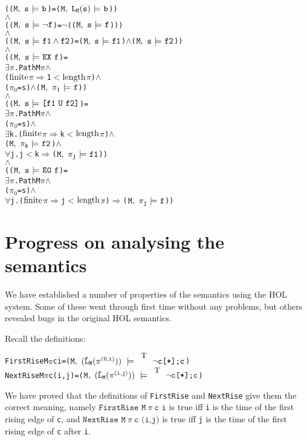 \documentclass{llncs}
\newcommand{\And}{\(\wedge\)}
\newcommand{\Imp}{\(\Rightarrow\)}
\newcommand{\Not}{\(\neg\)}
\newcommand{\Forall}{\(\forall\)}
\newcommand{\Exists}{\(\exists\)}
\newcommand{\IsFinitePath}{\({\rm{finite}}\)}
\newcommand{\PathLength}{\({\rm{length}}\)}
\newcommand{\Le}{\(<\)}
\newcommand{\T}{\texttt{\small\rm{T}}}
\newcommand{\bTrue}{\T}
\renewcommand{\Pi}{\(\pi\)}
\newcommand{\BSem}[3]{(\(\tt#1,~#2~{\models}~#3\))}
\newcommand{\SSem}[4]{(\(\tt{#1,~#2~\models^{\hspace*{-2.3mm}\raisebox{1mm}{\tt#3}}~#4}\))}
\newcommand{\OSem}[3]{(\(\tt{#1,~#2~{\models}~#3}\))}
\newcommand{\bNot}[1]{\neg#1}
\newcommand{\pathEl}[2]{#1_{#2}}
\newcommand{\PathEl}[2]{\(#1_{#2}\)}
\newcommand{\pathSeg}[2]{#1^{#2}}
\newcommand{\lHat}[1]{\hat{\texttt{L}}_{#1}}
\newcommand{\lNoHat}[1]{{\texttt{L}}_{#1}}
\newcommand{\sBool}[1]{#1}
\newcommand{\oBool}[1]{#1}
\newcommand{\oNot}[1]{\neg#1}
\newcommand{\sRepeat}[1]{#1\texttt{[*]}}
\newcommand{\sCat}[2]{#1\texttt{;}#2}
\newcommand{\oAnd}[2]{#1\wedge#2}
\newcommand{\oEx}[1]{{\texttt{EX}}~#1}
\newcommand{\oEg}[1]{{\texttt{EG}}~#1}
\newcommand{\oEu}[2]{\texttt{[}#1~{\texttt{U}}~#2\texttt{]}}
\newcommand\Hol{HOL\xspace}
\newcommand\HOL{\Hol}
\renewcommand{\t}[1]{\texttt{#1}}
\begin{document}
{\begin{alltt}
   (\OSem{M}{s}{\oBool{b}} = {\BSem{M}{\lNoHat{M}(s)}{b}})
   {\And}
   (\OSem{M}{s}{\oNot{f}} = {\Not}(\OSem{M}{s}{f})) 
   {\And}
   (\OSem{M}{s}{\oAnd{f1}{f2}} = \OSem{M}{s}{f1} {\And} \OSem{M}{s}{f2})
   {\And}
   (\OSem{M}{s}{\oEx{f}} = 
     {\Exists}{\Pi}. Path M {\Pi}                 {\And} 
         ({\IsFinitePath} {\Pi} {\Imp} 1 {\Le} \PathLength {\Pi}) {\And} 
         (\PathEl{{\pi}}{0} = s) {\And} \OSem{M}{\pathEl{{\pi}}{1}}{f})
   {\And}
   (\OSem{M}{s}{\oEu{f1}{f2}} = 
     {\Exists}{\Pi}. Path M {\Pi}                    {\And} 
         (\PathEl{{\pi}}{0} = s)                     {\And} 
         {\Exists}k. ({\IsFinitePath} {\Pi} {\Imp} k {\Le} \PathLength {\Pi}) {\And}
             \OSem{M}{\pathEl{{\pi}}{k}}{f2}             {\And} 
             {\Forall}j. j {\Le} k {\Imp} \OSem{M}{\pathEl{{\pi}}{j}}{f1})
   {\And}
   (\OSem{M}{s}{\oEg{f}} = 
     {\Exists}{\Pi}. Path M {\Pi} {\And} 
         (\PathEl{{\pi}}{0} = s)  {\And} 
         {\Forall}j. ({\IsFinitePath} {\Pi} {\Imp} j {\Le} \PathLength {\Pi}) {\Imp} \OSem{M}{\pathEl{{\pi}}{j}}{f})
\end{alltt}}

\section{Progress on analysing the semantics}\label{progress}

We have established a number of properties of the semantics using the \HOL system.
Some of these went through first time without any problems,
but others revealed bugs in the original HOL semantics.


Recall the definitions:


{\begin{alltt}
   FirstRise M {\Pi} c i    = \SSem{M}{(\lHat{M} (\pathSeg{\pi}{(0,i)}))}{\bTrue}{\sCat{\sRepeat{\sBool{\bNot{c}}}}{\sBool{c}}}
   NextRise M {\Pi} c (i,j) = \SSem{M}{(\lHat{M} (\pathSeg{\pi}{(i,j)}))}{\bTrue}{\sCat{\sRepeat{\sBool{\bNot{c}}}}{\sBool{c}}}
\end{alltt}}

We have proved that the definitions of \t{FirstRise} and \t{NextRise} give them the correct meaning,
namely $\t{FirstRise~M}~{\pi}~\t{c~i}$ is true iff \t{i} is the time of the first
rising edge of \t{c},
and $\t{NextRise~M}~{\pi}~\t{c~(i,j)}$ is true iff \t{j} is the time of the first
rising edge of \t{c} after \t{i}.

\medskip
\end{document}
